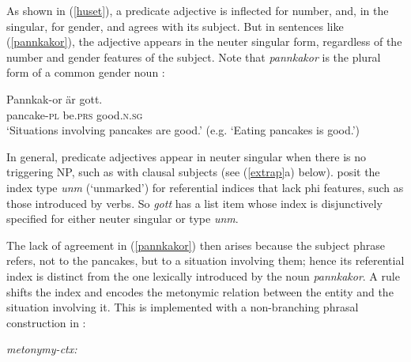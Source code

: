 \documentclass[output=paper
 	        ,biblatex
                ,babelshorthands
                ,newtxmath
                ,draftmode
                ,colorlinks, citecolor=brown
]{langscibook}
\begin{document}
\noindent
As shown in (\ref{huset}), a predicate adjective is inflected for number, and, in the singular, for gender, and agrees with its subject. But in sentences like (\ref{pannkakor}), the adjective appears in the neuter singular form, regardless of the number and gender features of the subject.  Note that \textit{pannkakor} is the plural form of a common gender noun \citep{Faarlund:1977, Enger:2004,Josefsson:2009}:

\begin{exe} 
\ex \label{pannkakor}
\gll   Pannkak-or 	är	gott. \\
	pancake-\textsc{pl}	be.\textsc{prs}	good.\textsc{n.sg} \\
\glt	`Situations involving pancakes are good.’ (e.g. `Eating pancakes is good.’)
\end{exe}

\noindent
In general,  predicate adjectives appear in neuter singular when there is no triggering NP, such as with clausal subjects (see (\ref{extrap}a) below).  \citet{Wechsler+Zlatic:2003} posit the index type \textit{unm} (`unmarked') for  referential indices that lack phi features, such as those introduced by verbs.   So \textit{gott} has a \subj list item whose index  is disjunctively specified for either neuter singular or type \textit{unm}.  

The lack of agreement in (\ref{pannkakor}) then arises because the subject phrase refers, not to the pancakes, but to a situation involving them; hence its referential index is distinct from the one lexically introduced by the noun \textit{pannkakor}.  A rule shifts the index and encodes the metonymic relation between the entity and the situation involving it.  This  is implemented with a non-branching phrasal construction in \citet[82, example\,(20)]{Wechsler:2013}:

\begin{exe} 
\ex	
\label{metonymy}
\textit{metonymy-ctx:}\\
\end{exe}
\end{document}
